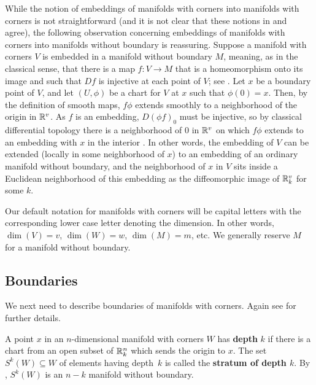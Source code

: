 While the notion of embeddings of manifolds with corners into manifolds with corners is not straightforward (and it is not clear that these notions in \cite{Joy12} and \cite{MaDo92} agree), the following observation concerning embeddings of manifolds with corners into manifolds without boundary is reassuring.
Suppose a manifold with corners $V$ is embedded in a manifold without boundary $M$, meaning, as in the classical sense, that there is a map $f \colon V \to M$ that is a homeomorphism onto its image and such that $Df$ is injective at each point of $V$; see \cite[Definition 3.3.1 and Theorem 3.2.6]{MaDo92}.
Let $x$ be a boundary point of $V$, and let $(U,\phi)$ be a chart for $V$ at $x$ such that $\phi(0)=x$.
Then, by the definition of smooth maps, $f \phi$ extends smoothly to a neighborhood of the origin in $\mathbb{R}^v$.
As $f$ is an embedding, $D(\phi f)_0$ must be injective, so by classical differential topology there is a neighborhood of $0$ in $\mathbb{R}^v$ on which $f\phi$ extends to an embedding with $x$ in the interior \cite[Section 1.3]{GuPo74}.
In other words, the embedding of $V$ can be extended (locally in some neighborhood of $x$) to an embedding of an ordinary manifold without boundary, and the neighborhood of $x$ in $V$ sits inside a Euclidean neighborhood of this embedding as the diffeomorphic image of $\mathbb{R}^v_k$ for some $k$.

\begin{notation}
	Our default notation for manifolds with corners will be capital letters with the corresponding lower case letter denoting the dimension.
	In other words, $\dim(V) = v$, $\dim(W) = w$, $\dim(M) = m$, etc.
	We generally reserve $M$ for a manifold without boundary.
\end{notation}

\subsection{Boundaries}\label{S: boundaries}

We next need to describe boundaries of manifolds with corners.
Again see \cite[Section 2]{Joy12} for further details.

\begin{definition}
	A point $x$ in an $n$-dimensional manifold with corners $W$ has \textbf{depth} $k$ if there is a chart from an open subset of $\mathbb{R}^n_k$ which sends the origin to $x$.
	The set $S^k(W) \subseteq W$ of elements having depth~$k$ is called the \textbf{stratum of depth $k$}.
	By \cite[Proposition 2.4.]{Joy12}, $S^k(W)$ is an $n-k$ manifold without boundary.
\end{definition}

